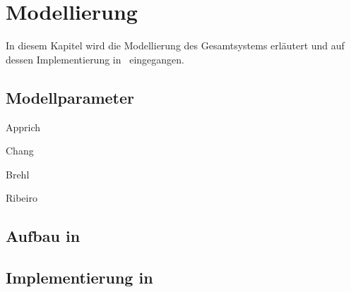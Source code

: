 \chapter{Modellierung}\label{cha:modell}

In diesem Kapitel wird die Modellierung des Gesamtsystems erläutert und auf dessen Implementierung in \Simulink\ eingegangen.





\section{Modellparameter}\label{sec:mparams}



Apprich \cite{apprich}

Chang \cite{chang}

Brehl \cite{brehl}

Ribeiro \cite{ribeiro}


\section{Aufbau in \Simulink}



\section{Implementierung in \Matlab}
